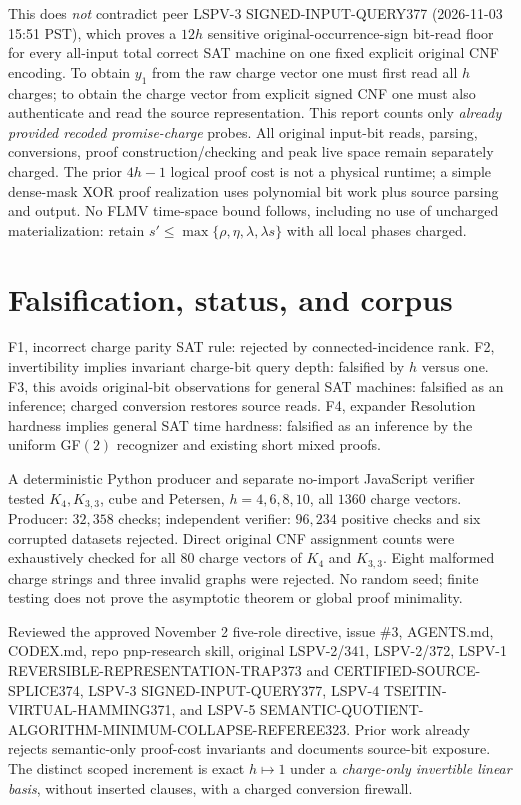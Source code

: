 \documentclass[11pt]{article}
\begin{document}
This does \emph{not} contradict peer LSPV-3 SIGNED-INPUT-QUERY377 (2026-11-03 15:51 PST), which proves a $12h$ sensitive original-occurrence-sign bit-read floor for every all-input total correct SAT machine on one fixed explicit original CNF encoding. To obtain $y_1$ from the raw charge vector one must first read all $h$ charges; to obtain the charge vector from explicit signed CNF one must also authenticate and read the source representation. This report counts only \emph{already provided recoded promise-charge} probes. All original input-bit reads, parsing, conversions, proof construction/checking and peak live space remain separately charged. The prior $4h-1$ logical proof cost is not a physical runtime; a simple dense-mask XOR proof realization uses polynomial bit work plus source parsing and output. No FLMV time-space bound follows, including no use of uncharged materialization: retain $s'\le\max\{\rho,\eta,\lambda,\lambda s\}$ with all local phases charged.

\section*{Falsification, status, and corpus}
F1, incorrect charge parity SAT rule: rejected by connected-incidence rank. F2, invertibility implies invariant charge-bit query depth: falsified by $h$ versus one. F3, this avoids original-bit observations for general SAT machines: falsified as an inference; charged conversion restores source reads. F4, expander Resolution hardness implies general SAT time hardness: falsified as an inference by the uniform GF$(2)$ recognizer and existing short mixed proofs.

A deterministic Python producer and separate no-import JavaScript verifier tested $K_4,K_{3,3}$, cube and Petersen, $h=4,6,8,10$, all $1360$ charge vectors. Producer: $32,358$ checks; independent verifier: $96,234$ positive checks and six corrupted datasets rejected. Direct original CNF assignment counts were exhaustively checked for all $80$ charge vectors of $K_4$ and $K_{3,3}$. Eight malformed charge strings and three invalid graphs were rejected. No random seed; finite testing does not prove the asymptotic theorem or global proof minimality.

Reviewed the approved November 2 five-role directive, issue \#3, AGENTS.md, CODEX.md, repo pnp-research skill, original LSPV-2/341, LSPV-2/372, LSPV-1 REVERSIBLE-REPRESENTATION-TRAP373 and CERTIFIED-SOURCE-SPLICE374, LSPV-3 SIGNED-INPUT-QUERY377, LSPV-4 TSEITIN-VIRTUAL-HAMMING371, and LSPV-5 SEMANTIC-QUOTIENT-ALGORITHM-MINIMUM-COLLAPSE-REFEREE323. Prior work already rejects semantic-only proof-cost invariants and documents source-bit exposure. The distinct scoped increment is exact $h\mapsto1$ under a \emph{charge-only invertible linear basis}, without inserted clauses, with a charged conversion firewall.
\end{document}
